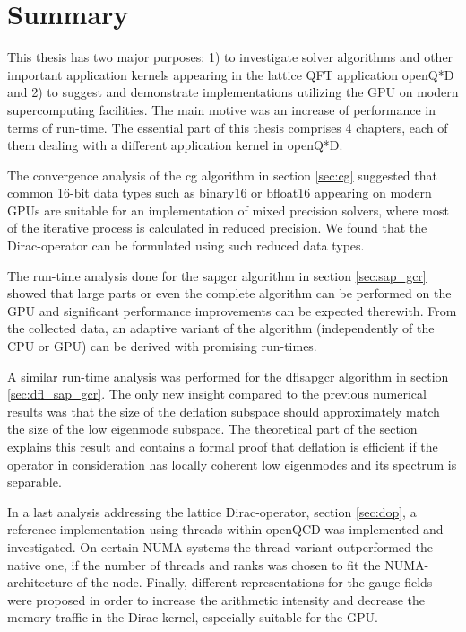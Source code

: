 \documentclass{article}
\theoremstyle{plain} %
\theoremstyle{convention} %
\theoremstyle{remark} %
\numberwithin{equation}{section}
\begin{document}
\newpage

\section{Summary}

\label{sec:summary}

This thesis has two major purposes: 1) to investigate solver algorithms and other important application kernels appearing in the lattice QFT application openQ*D and 2) to suggest and demonstrate implementations utilizing the GPU on modern supercomputing facilities. The main motive was an increase of performance in terms of run-time. The essential part of this thesis comprises \num{4} chapters, each of them dealing with a different application kernel in openQ*D.

The convergence analysis of the \acrshort{cg} algorithm in section \ref{sec:cg} suggested that common \num{16}-bit data types such as \gls{binary16} or \gls{bfloat16} appearing on modern GPUs are suitable for an implementation of mixed precision solvers, where most of the iterative process is calculated in reduced precision. We found that the Dirac-operator can be formulated using such reduced data types.

The run-time analysis done for the \acrshort{sapgcr} algorithm in section \ref{sec:sap_gcr} showed that large parts or even the complete algorithm can be performed on the GPU and significant performance improvements can be expected therewith. From the collected data, an adaptive variant of the algorithm (independently of the CPU or GPU) can be derived with promising run-times.

A similar run-time analysis was performed for the \acrshort{dflsapgcr} algorithm in section \ref{sec:dfl_sap_gcr}. The only new insight compared to the previous numerical results was that the size of the deflation subspace should approximately match the size of the low eigenmode subspace. The theoretical part of the section explains this result and contains a formal proof that deflation is efficient if the operator in consideration has locally coherent low eigenmodes and its spectrum is separable.

In a last analysis addressing the lattice Dirac-operator, section \ref{sec:dop}, a reference implementation using threads within openQCD was implemented and investigated. On certain NUMA-systems the thread variant outperformed the native one, if the number of threads and ranks was chosen to fit the NUMA-architecture of the node. Finally, different representations for the gauge-fields were proposed in order to increase the arithmetic intensity and decrease the memory traffic in the Dirac-kernel, especially suitable for the GPU.
\end{document}
